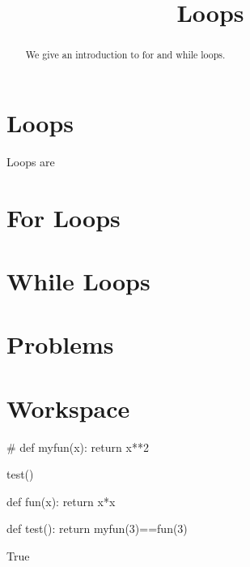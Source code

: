 \documentclass{ximera}
\title{Loops}
\begin{document}
  
\begin{abstract}  
We give an introduction to for and while loops.
\end{abstract}  
\maketitle

\section{Loops}

Loops are 

\section{For Loops}

\section{While Loops}

\section{Problems}

\begin{question}
\end{question}

\begin{question}
\end{question}

\section{Workspace}


\begin{sageCell}
#
def myfun(x):
        return x**2

test()
\end{sageCell}

\begin{expandable}
\begin{sageOutput}
def fun(x):
        return x*x

def test():
	return myfun(3)==fun(3)

True
\end{sageOutput}
\end{expandable}
\end{document}
